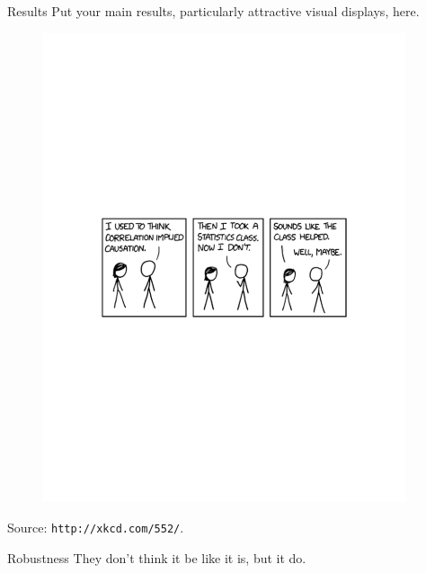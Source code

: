 \documentclass[serif,mathserif,final]{beamer}
\begin{document}
\begin{frame}{}
\begin{columns}[t]
\begin{column}{0.32\linewidth}
      \begin{block}{Results}
      Put your main results, particularly attractive visual displays, here.
       \begin{figure}[htb]
  \centering
          \includegraphics[width=\columnwidth]{correlation.pdf}
        \end{figure}
        Source: \texttt{http://xkcd.com/552/}.
      \end{block}

      \begin{block}{Robustness}
They don't think it be like it is, but it do.
      \end{block}    

    \end{column}%

    \begin{column}{0.32\linewidth}


\end{column}
\end{columns}
\end{frame}
\end{document}
